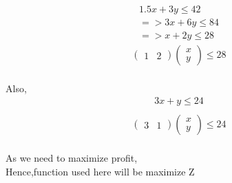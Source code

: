 \documentclass[10pt, a4paper]{article}
\newcommand{\myvec}[1]{\ensuremath{\begin{pmatrix}#1\end{pmatrix}}}
\begin{document}
\begin{align}
 1.5x+3y \le 42 \\
=>3x+6y \le 84 \\
=>x+2y \le28
\end{align}
\begin{align}
\myvec{1&2}\myvec{x\\y}\le 28
\end{align}\\
Also,\\
\begin{align}
 3x+y \le 24 \\
\end{align}
\begin{align}
\myvec{3&1}\myvec{x\\y}\le 24
\end{align}\\
As we need to maximize profit,\\
Hence,function used here will be maximize Z\\
\end{document}
